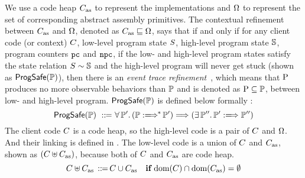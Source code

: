 We use a code heap $C_{\text{as}}$
to represent the implementations
 and $\Omega$ to represent the set of corresponding 
abstract assembly primitives. The contextual refinement between 
$C_{\text{as}}$ and $\Omega$, denoted as $C_{\text{as}} \sqsubseteq \Omega$, 
says that if and only if for any client code 
(or context) $C$, low-level program 
state $S$, high-level program state $\mathbb{S}$, program counters 
$\texttt{pc}$ and $\texttt{npc}$, if the low- and high-level program states satisfy the 
state relation ${S} \sim {\mathbb{S}}$ and the high-level program 
will never get stuck (shown as $\textsf{ProgSafe}(\mathbb{P})$), 
then there is an {\it event trace refinement}~\cite{liang14lics}, 
which means that $\text{P}$ produces no more observable behaviors 
than $\mathbb{P}$ and is denoted as $\text{P} \subseteq \mathbb{P}$,  
between low- and high-level program. $\textsf{ProgSafe}(\mathbb{P})$ 
is defined below formally : 
\[
    \progsafe(\HProg) \ \define \ 
    \forall \, \HProg'. \, 
    (\HGlobMultiTrans{\HProg}{}{*}{\HProg'}) 
    \Longrightarrow 
    (\exists \, \HProg''. \, 
        \HGlobTrans{\HProg'}{}{\HProg''})
\]
{\color{blue}
The client code $C$ is a \sparc{} code heap, so 
the high-level code is a pair of $C$ and $\Omega$. 
And their linking is defined in 
\Fig{\ref{fig:selected-opsem-high-level-prog}}. 
The low-level code is a union of $C$ and $C_{\text{as}}$, 
shown as $(C\uplus C_{\text{as}})$, because both of 
$C$ and $C_{\text{as}}$ are \sparc{} code heap.
\[
    C \uplus C_{\text{as}} \,::\!\!{=}\,
    C \cup C_{\text{as}} \quad
    \textbf{if} \ \text{dom}(C)\cap\text{dom}(C_{\text{as}}) = \emptyset
\] 
}

